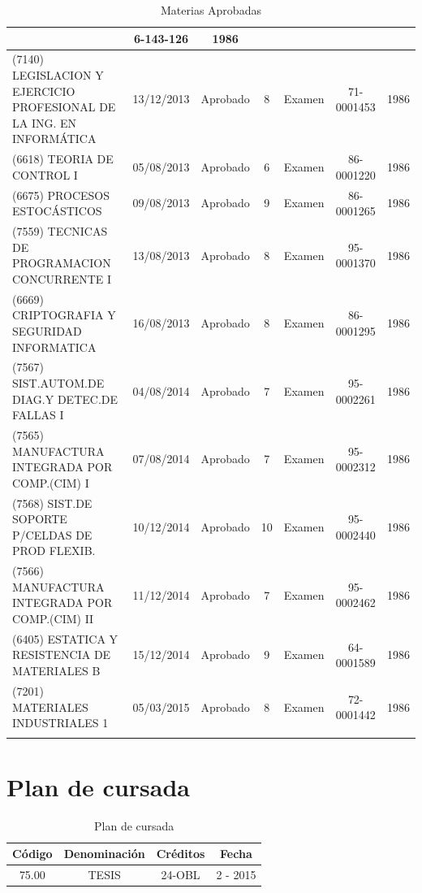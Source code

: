 \documentclass[a4paper,10pt]{article}
\begin{document}
\begin{center}
\begin{longtable}{|p{3.5cm}|c|c|c|p{1.4cm}|c|c|}
			& 6-143-126 & 1986 \\
			\hline
			(7140) LEGISLACION Y EJERCICIO PROFESIONAL DE LA ING. EN INFORMÁTICA
			& 13/12/2013 & Aprobado & 8 & Examen & 71-0001453 & 1986 \\
			\hline
			(6618) TEORIA DE CONTROL I & 05/08/2013 & Aprobado & 6 & Examen & 
			86-0001220 & 1986 \\
			\hline
			(6675) PROCESOS ESTOCÁSTICOS & 09/08/2013 & Aprobado & 9 & Examen & 
			86-0001265 & 1986 \\
			\hline
			(7559) TECNICAS DE PROGRAMACION CONCURRENTE I & 13/08/2013 & 
			Aprobado & 8 & Examen & 95-0001370 & 1986 \\
			\hline
			(6669) CRIPTOGRAFIA Y SEGURIDAD INFORMATICA & 16/08/2013 & Aprobado
			& 8 & Examen & 86-0001295 & 1986 \\
			\hline
			(7567) SIST.AUTOM.DE DIAG.Y DETEC.DE FALLAS I & 04/08/2014 & 
			Aprobado & 7 & Examen & 95-0002261 & 1986 \\
			\hline
			(7565) MANUFACTURA INTEGRADA POR COMP.(CIM) I & 07/08/2014 & 
			Aprobado & 7 & Examen & 95-0002312 & 1986 \\
			\hline
			(7568) SIST.DE SOPORTE P/CELDAS DE PROD FLEXIB. & 10/12/2014 & 
			Aprobado & 10 & Examen & 95-0002440 & 1986 \\
			\hline
			(7566) MANUFACTURA INTEGRADA POR COMP.(CIM) II & 11/12/2014 & 
			Aprobado & 7 & Examen & 95-0002462 & 1986 \\
			\hline
			(6405) ESTATICA Y RESISTENCIA DE MATERIALES B & 15/12/2014 & 
			Aprobado & 9 & Examen & 64-0001589 & 1986 \\
			\hline
			(7201) MATERIALES INDUSTRIALES 1 & 05/03/2015 & 
			Aprobado & 8 & Examen & 72-0001442 & 1986 \\
			\hline
			\caption{Materias Aprobadas} \label{tab:matApr}
		\end{longtable}
	\end{center}
	
    \newpage
	\section{Plan de cursada}
	
	\begin{table}[!htb]
		\centering
		\begin{tabular}{|c|c|c|c|}
			\hline
			Código & Denominación & Créditos & Fecha \\
			\hline
			75.00 & TESIS & 24-OBL & 2 - 2015 \\
			\hline
		\end{tabular}
		\caption{Plan de cursada} \label{tabPlanCursada}
	\end{table}
\end{document}
